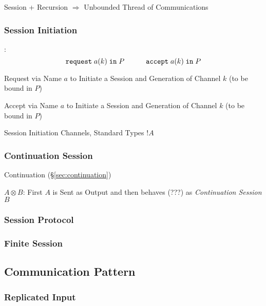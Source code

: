 Session + Recursion $\Rightarrow$ Unbounded Thread of Communications
\cite{honda-vasconcelos-kubo98}



\subsubsection{Session Initiation}\label{sec:session_initiation}

\cite{honda-vasconcelos-kubo98}:
\[
  \mathtt{request} \; a(k) \; \mathtt{in} \; P
  \quad\quad\quad
  \mathtt{accept} \; a(k) \; \mathtt{in} \; P
\]

Request via Name $a$ to Initiate a Session and Generation of Channel
$k$ (to be bound in $P$)

Accept via Name $a$ to Initiate a Session and Generation of Channel
$k$ (to be bound in $P$)

Session Initiation Channels, Standard Types $!A$



\subsubsection{Continuation Session}\label{sec:continuation_session}

Continuation (\S\ref{sec:continuation})

$A \otimes B$: First $A$ is Sent as Output and then behaves (???) as
\emph{Continuation Session} $B$



\subsubsection{Session Protocol}\label{sec:session_protocol}

\subsubsection{Finite Session}\label{sec:finite_session}


\subsection{Communication Pattern}\label{sec:communication_pattern}

\subsubsection{Replicated Input}\label{sec:replicated_input}

